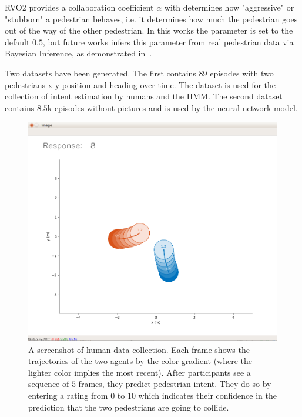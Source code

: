 RVO2 provides a collaboration coefficient $\alpha$ with determines how "aggressive" or "stubborn" a pedestrian behaves, i.e. it determines how much the pedestrian goes out of the way of the other pedestrian. In this works the parameter is set to the default $0.5$, but future works infers this parameter from real pedestrian data via Bayesian Inference, as demonstrated in~\cite{Bera2017}.

Two datasets have been generated. The first contains $89$ episodes with two pedestrians x-y position and heading over time. The dataset is used for the collection of intent estimation by humans and the HMM. The second dataset contains $8.5$k episodes without pictures and is used by the neural network model.

\begin{figure}[t]
  \centering
  \includegraphics[width=\linewidth]{figures/screenshot.png}
  \caption{A screenshot of human data collection. Each frame shows the trajectories of the two agents by the color gradient (where the lighter color implies the most recent). 
  After participants see a sequence of $5$ frames, they predict pedestrian intent. They do so by entering a rating from $0$ to $10$ which indicates their confidence in the prediction that the two pedestrians are going to collide.}
  \label{fig:human-data-collection}
\end{figure}


